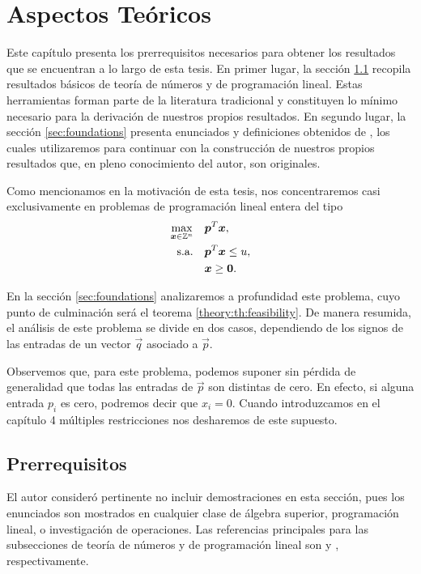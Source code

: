 \chapter{Aspectos Teóricos}
\noindent
Este capítulo presenta los prerrequisitos necesarios para obtener los resultados que se encuentran a
lo largo de esta tesis.
En primer lugar, la sección \ref{sec:prerreq} recopila resultados básicos de teoría de números y de
programación lineal. Estas herramientas forman parte de la literatura tradicional y constituyen lo
mínimo necesario para la derivación de nuestros propios resultados.
En segundo lugar, la sección \ref{sec:foundations} presenta enunciados y definiciones obtenidos de
\cite{herr}, los cuales utilizaremos para continuar con la construcción de nuestros propios
resultados que, en pleno conocimiento del autor, son originales.

Como mencionamos en la motivación de esta tesis, nos concentraremos casi exclusivamente en problemas
de programación lineal entera del tipo
\begin{subequations}
	\label{theory:formulation}
	\begin{align}
		\max_{\boldsymbol{x} \in \mathbb{Z}^n} \quad
			& \boldsymbol{p}^T\boldsymbol{x}, \label{theory:objective} \\
		\text{s.a.} \quad
			& \boldsymbol{p}^T\boldsymbol{x} \leq u, \label{theory:constraint:budget} \\
			& \boldsymbol{x} \geq \boldsymbol{0}. \nonumber
	\end{align}
\end{subequations}

En la sección \ref{sec:foundations} analizaremos a profundidad este problema, cuyo punto de
culminación será el teorema \ref{theory:th:feasibility}. De manera resumida, el análisis de este
problema se divide en dos casos, dependiendo de los signos de las entradas de un vector $\vec{q}$
asociado a $\vec{p}$.

Observemos que, para este problema, podemos suponer sin pérdida de generalidad que todas las
entradas de $\vec{p}$ son distintas de cero. En efecto, si alguna entrada $p_i$ es cero, podremos
decir que $x_i = 0$. Cuando introduzcamos en el capítulo 4 múltiples restricciones nos desharemos de
este supuesto.

\section{Prerrequisitos}
\label{sec:prerreq}
\noindent
El autor consideró pertinente no incluir demostraciones en esta sección, pues los enunciados son
mostrados en cualquier clase de álgebra superior, programación lineal, o investigación de
operaciones. Las referencias principales para las subsecciones de teoría de números y de
programación lineal son \cite{carmen} y \cite{fabs}, respectivamente.

